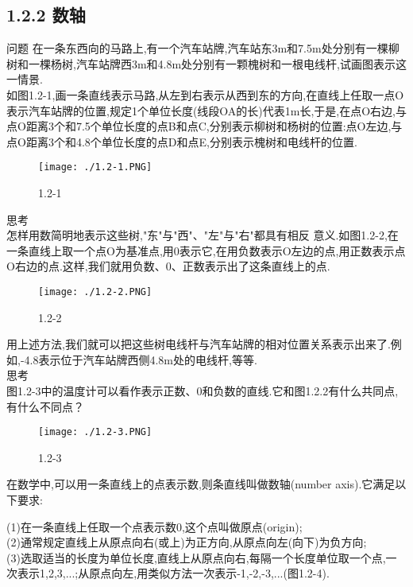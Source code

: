 \documentclass{article}
\begin{document}
	\subsection*{1.2.2 数轴}
	问题 在一条东西向的马路上,有一个汽车站牌,汽车站东3m和7.5m处分别有一棵柳树和一棵杨树,汽车站牌西3m和4.8m处分别有一颗槐树和一根电线杆,试画图表示这一情景.\\
	\indent 如图1.2-1,画一条直线表示马路,从左到右表示从西到东的方向,在直线上任取一点O表示汽车站牌的位置,规定1个单位长度(线段OA的长)代表1m长,于是,在点O右边,与点O距离3个和7.5个单位长度的点B和点C,分别表示柳树和杨树的位置:点O左边,与点O距离3个和4.8个单位长度的点D和点E,分别表示槐树和电线杆的位置.\\
	\begin{figure}[ht!]
		\centering
		\texttt{[image: ./1.2-1.PNG]}
		\caption{1.2-1}
	\end{figure}

	思考\\
	\indent 怎样用数简明地表示这些树,"东"与"西"、"左"与"右"都具有相反 意义.如图1.2-2,在一条直线上取一个点O为基准点,用0表示它,在用负数表示O左边的点,用正数表示点O右边的点.这样,我们就用负数、0、正数表示出了这条直线上的点.\\
	\begin{figure}[ht!]
		\centering
		\texttt{[image: ./1.2-2.PNG]}
		\caption{1.2-2}
	\end{figure}
	\indent 用上述方法,我们就可以把这些树电线杆与汽车站牌的相对位置关系表示出来了.例如,-4.8表示位于汽车站牌西侧4.8m处的电线杆,等等.\\
	
	思考\\
	\indent 图1.2-3中的温度计可以看作表示正数、0和负数的直线.它和图1.2.2有什么共同点,有什么不同点？
	\begin{figure}[ht!]
		\centering
		\texttt{[image: ./1.2-3.PNG]}
		\caption{1.2-3}
	\end{figure}

	\begin{defintion}
		在数学中,可以用一条直线上的点表示数,则条直线叫做数轴(number axis).它满足以下要求:\\
	\end{defintion}
	
	\begin{propertory}
		\indent (1)在一条直线上任取一个点表示数0,这个点叫做原点(origin);\\
		\indent (2)通常规定直线上从原点向右(或上)为正方向,从原点向左(向下)为负方向;\\
		\indent (3)选取适当的长度为单位长度,直线上从原点向右,每隔一个长度单位取一个点,一次表示1,2,3,...;从原点向左,用类似方法一次表示-1,-2,-3,...(图1.2-4).\\
	\end{propertory}
	
\end{document}

